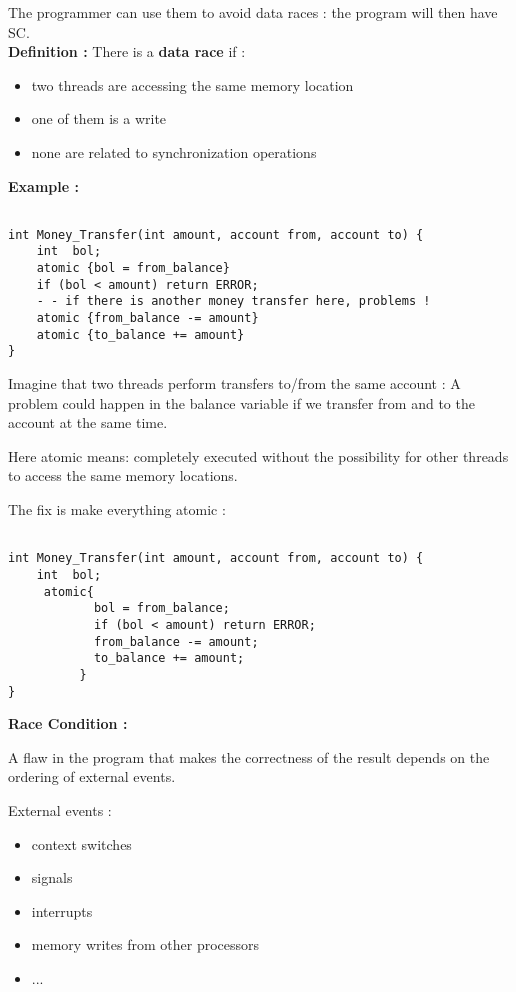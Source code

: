 The programmer can use them to avoid data races : the program will then have SC.\\

\textbf{Definition : } There is a \textbf{data race} if :
\begin{itemize}
\item two threads are accessing the same memory location
\item one of them is a write
\item none are related to synchronization operations
\end{itemize}

\vspace{5cm}

\textbf{Example :}

\begin{verbatim}

int Money_Transfer(int amount, account from, account to) {
	int  bol;
	atomic {bol = from_balance}
	if (bol < amount) return ERROR;
	- - if there is another money transfer here, problems !
	atomic {from_balance -= amount}
	atomic {to_balance += amount}
}

\end{verbatim}

Imagine that two threads perform transfers to/from the same account : A problem could happen in the balance variable if we transfer from and to the account at the same time.

Here atomic means: completely executed without the possibility for other threads to access the same memory locations.

The fix is make everything atomic :

\begin{verbatim}

int Money_Transfer(int amount, account from, account to) {
	int  bol;
     atomic{
            bol = from_balance;
            if (bol < amount) return ERROR;
            from_balance -= amount;
            to_balance += amount;
          }
}

\end{verbatim}


\textbf{Race Condition :}

A flaw in the program that makes the correctness of the result depends on the ordering of external events.

External events :
\begin{itemize}
\item context switches
\item signals
\item interrupts
\item memory writes from other processors
\item ...
\end{itemize}

